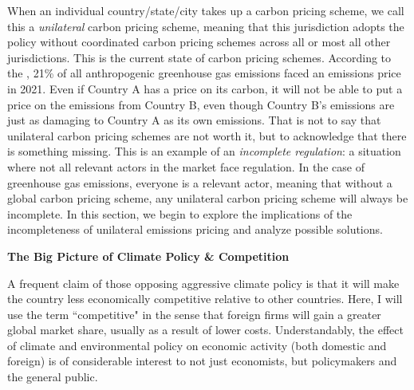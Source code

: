 When an individual country/state/city takes up a carbon pricing scheme, we call this a \emph{unilateral} carbon pricing scheme, meaning that this jurisdiction adopts the policy without coordinated carbon pricing schemes across all or most all other jurisdictions. This is the current state of carbon pricing schemes. According to the \cite{wbank}, 21\% of all anthropogenic greenhouse gas emissions faced an emissions price in 2021. Even if Country A has a price on its carbon, it will not be able to put a price on the emissions from Country B, even though Country B's emissions are just as damaging to Country A as its own emissions. That is not to say that unilateral carbon pricing schemes are not worth it, but to acknowledge that there is something missing. This is an example of an \emph{incomplete regulation}: a situation where not all relevant actors in the market face regulation. In the case of greenhouse gas emissions, everyone is a relevant actor, meaning that without a global carbon pricing scheme, any unilateral carbon pricing scheme will always be incomplete. In this section, we begin to explore the implications of the incompleteness of unilateral emissions pricing and analyze possible solutions.


\textbf{The Big Picture of Climate Policy \& Competition}

A frequent claim of those opposing aggressive climate policy is that it will make the country less economically competitive relative to other countries. Here, I will use the term ``competitive" in the sense that foreign firms will gain a greater global market share, usually as a result of lower costs. Understandably, the effect of climate and environmental policy on economic activity (both domestic and foreign) is of considerable interest to not just economists, but policymakers and the general public.

